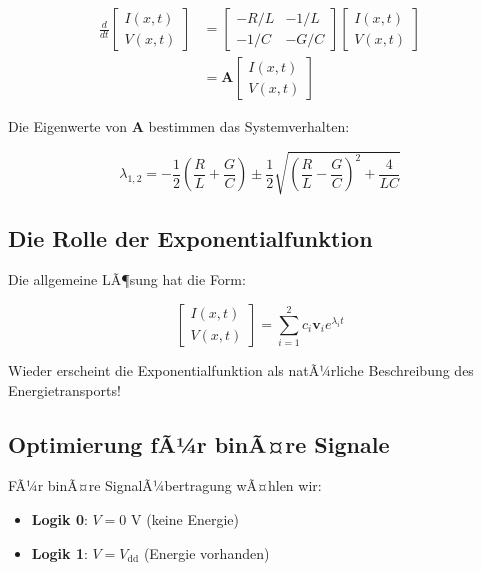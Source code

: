 ﻿\documentclass[12pt,a4paper]{article}
\theoremstyle{definition}
\theoremstyle{remark}
\begin{document}
\begin{align}
\frac{d}{dt}\begin{bmatrix} I(x,t) \\ V(x,t) \end{bmatrix} &= \begin{bmatrix} -R/L & -1/L \\ -1/C & -G/C \end{bmatrix} \begin{bmatrix} I(x,t) \\ V(x,t) \end{bmatrix} \\
&= \mathbf{A} \begin{bmatrix} I(x,t) \\ V(x,t) \end{bmatrix}
\end{align}

Die Eigenwerte von $\mathbf{A}$ bestimmen das Systemverhalten:

\begin{equation}
\lambda_{1,2} = -\frac{1}{2}\left(\frac{R}{L} + \frac{G}{C}\right) \pm \frac{1}{2}\sqrt{\left(\frac{R}{L} - \frac{G}{C}\right)^2 + \frac{4}{LC}}
\end{equation}

\subsection{Die Rolle der Exponentialfunktion}

Die allgemeine LÃ¶sung hat die Form:

\begin{equation}
\begin{bmatrix} I(x,t) \\ V(x,t) \end{bmatrix} = \sum_{i=1}^{2} c_i \mathbf{v}_i e^{\lambda_i t}
\end{equation}

Wieder erscheint die Exponentialfunktion als natÃ¼rliche Beschreibung des Energietransports!

\subsection{Optimierung fÃ¼r binÃ¤re Signale}

FÃ¼r binÃ¤re SignalÃ¼bertragung wÃ¤hlen wir:

\begin{itemize}
\item \textbf{Logik 0}: $V = 0$ V (keine Energie)
\item \textbf{Logik 1}: $V = V_{\text{dd}}$ (Energie vorhanden)
\end{itemize}
\end{document}
